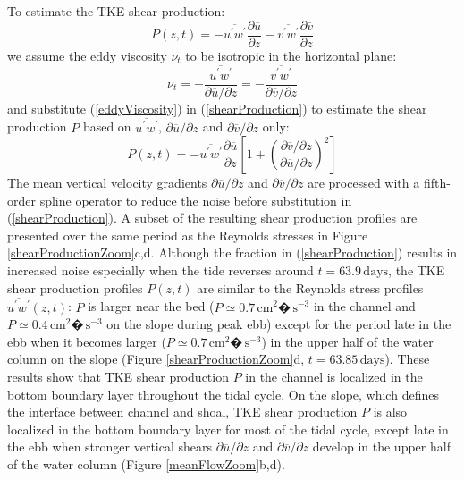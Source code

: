 To estimate the TKE shear production:
\begin{equation}
 P(z,t)=-\overline{u^{\prime} w^{\prime}}\frac{\partial \overline{u}}{\partial z} - \overline{v^{\prime} w^{\prime}}\frac{\partial \overline{v}}{ \partial z}
 \label{shearProduction}
 \end{equation}
we assume the eddy viscosity $\nu_{t}$ to be isotropic in the horizontal plane:
\begin{equation}
 \nu_{t}=-\frac{\overline{u^{\prime} w^{\prime}}}{\partial \overline{u} / \partial z}=-\frac{\overline{v^{\prime} w^{\prime}}}{\partial \overline{v} / \partial z}
 \label{eddyViscosity}
 \end{equation}
and substitute (\ref{eddyViscosity}) in (\ref{shearProduction}) to estimate the shear production $P$ based on $\overline{u^{\prime} w^{\prime}}$, $\partial \overline{u} / \partial z$ and $\partial \overline{v} / \partial z$ only:
\begin{equation}
 P(z,t)=-\overline{u^{\prime} w^{\prime}}\frac{\partial \overline{u}}{\partial z} \left[ 1 + \left( \frac{\partial \overline{v} / \partial z}{\partial \overline{u} / \partial z} \right)^{2} \right]
 \label{shearProduction}
 \end{equation}
The mean vertical velocity gradients $\partial \overline{u} / \partial z$ and $\partial \overline{v} / \partial z$ are processed with a fifth-order spline operator to reduce the noise before substitution in (\ref{shearProduction}). A subset of the resulting shear production profiles are presented over the same period as the Reynolds stresses in Figure \ref{shearProductionZoom}c,d. Although the fraction in (\ref{shearProduction}) results in increased noise especially when the tide reverses around $t=63.9 \, \mathrm{days}$, the TKE shear production profiles $P(z,t)$ are similar to the Reynolds stress profiles $\overline{u^{\prime} w^{\prime}}(z,t)$: $P$ is larger near the bed ($P \simeq 0.7 \, \mathrm{cm^2�\, s^{-3}}$ in the channel and $P \simeq 0.4 \, \mathrm{cm^2�\, s^{-3}}$ on the slope during peak ebb) except for the period late in the ebb when it becomes larger ($P \simeq 0.7 \, \mathrm{cm^2�\, s^{-3}}$) in the upper half of the water column on the slope (Figure \ref{shearProductionZoom}d, $t=63.85\,\mathrm{days}$). These results show that TKE shear production $P$ in the channel is localized in the bottom boundary layer throughout the tidal cycle. On the slope, which defines the interface between channel and shoal, TKE shear production $P$ is also localized in the bottom boundary layer for most of the tidal cycle, except late in the ebb when stronger vertical shears $\partial \overline{u} / \partial z$ and $\partial \overline{v} / \partial z$ develop in the upper half of the water column (Figure \ref{meanFlowZoom}b,d).


